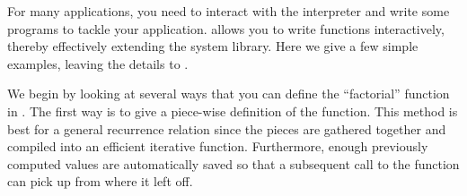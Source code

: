 {{{{{{{{For many applications,
you need to interact with the interpreter and write some
\Language{} programs to tackle your application.
\Language{} allows you to write functions interactively,
thereby effectively extending the system library.
Here we give a few simple examples, leaving the details to .

We begin by looking at several ways that you can define the
``factorial'' function in \Language{}.
The first way is to give a
piece-wise definition of the function.
This method is best for a general recurrence
relation since the pieces are gathered together and compiled into
an efficient iterative function.
Furthermore, enough previously computed values are automatically
saved so that a subsequent call to the function can pick up from
where it left off.

}}}}}}}}
